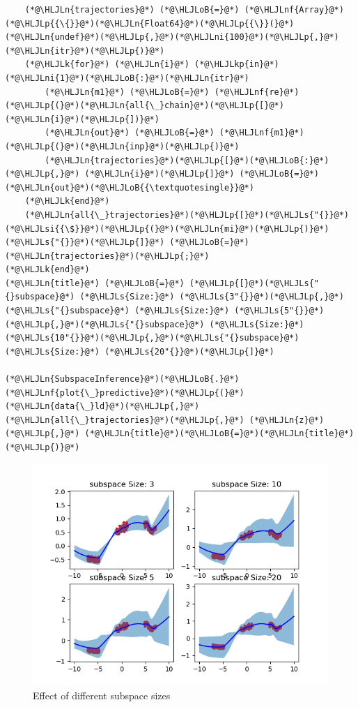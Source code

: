 \documentclass[12pt,a4paper]{article}
\newcommand{\HLJLk}[1]{\textcolor[RGB]{148,91,176}{\textbf{#1}}}
\newcommand{\HLJLkp}[1]{\textcolor[RGB]{148,91,176}{\textbf{#1}}}
\newcommand{\HLJLn}[1]{#1}
\newcommand{\HLJLnf}[1]{\textcolor[RGB]{66,102,213}{#1}}
\newcommand{\HLJLs}[1]{\textcolor[RGB]{201,61,57}{#1}}
\newcommand{\HLJLsi}[1]{#1}
\newcommand{\HLJLni}[1]{\textcolor[RGB]{59,151,46}{#1}}
\newcommand{\HLJLoB}[1]{\textcolor[RGB]{102,102,102}{\textbf{#1}}}
\newcommand{\HLJLp}[1]{#1}
\begin{document}
\begin{lstlisting}
    (*@\HLJLn{trajectories}@*) (*@\HLJLoB{=}@*) (*@\HLJLnf{Array}@*)(*@\HLJLp{{\{}}@*)(*@\HLJLn{Float64}@*)(*@\HLJLp{{\}}(}@*)(*@\HLJLn{undef}@*)(*@\HLJLp{,}@*)(*@\HLJLni{100}@*)(*@\HLJLp{,}@*)(*@\HLJLn{itr}@*)(*@\HLJLp{)}@*)
    (*@\HLJLk{for}@*) (*@\HLJLn{i}@*) (*@\HLJLkp{in}@*) (*@\HLJLni{1}@*)(*@\HLJLoB{:}@*)(*@\HLJLn{itr}@*)
        (*@\HLJLn{m1}@*) (*@\HLJLoB{=}@*) (*@\HLJLnf{re}@*)(*@\HLJLp{(}@*)(*@\HLJLn{all{\_}chain}@*)(*@\HLJLp{[}@*)(*@\HLJLn{i}@*)(*@\HLJLp{])}@*)
        (*@\HLJLn{out}@*) (*@\HLJLoB{=}@*) (*@\HLJLnf{m1}@*)(*@\HLJLp{(}@*)(*@\HLJLn{inp}@*)(*@\HLJLp{)}@*)
        (*@\HLJLn{trajectories}@*)(*@\HLJLp{[}@*)(*@\HLJLoB{:}@*)(*@\HLJLp{,}@*) (*@\HLJLn{i}@*)(*@\HLJLp{]}@*) (*@\HLJLoB{=}@*) (*@\HLJLn{out}@*)(*@\HLJLoB{{\textquotesingle}}@*)
    (*@\HLJLk{end}@*)
    (*@\HLJLn{all{\_}trajectories}@*)(*@\HLJLp{[}@*)(*@\HLJLs{"{}}@*)(*@\HLJLsi{{\$}}@*)(*@\HLJLp{(}@*)(*@\HLJLn{mi}@*)(*@\HLJLp{)}@*)(*@\HLJLs{"{}}@*)(*@\HLJLp{]}@*) (*@\HLJLoB{=}@*) (*@\HLJLn{trajectories}@*)(*@\HLJLp{;}@*)
(*@\HLJLk{end}@*)
(*@\HLJLn{title}@*) (*@\HLJLoB{=}@*) (*@\HLJLp{[}@*)(*@\HLJLs{"{}subspace}@*) (*@\HLJLs{Size:}@*) (*@\HLJLs{3"{}}@*)(*@\HLJLp{,}@*)(*@\HLJLs{"{}subspace}@*) (*@\HLJLs{Size:}@*) (*@\HLJLs{5"{}}@*)(*@\HLJLp{,}@*)(*@\HLJLs{"{}subspace}@*) (*@\HLJLs{Size:}@*) (*@\HLJLs{10"{}}@*)(*@\HLJLp{,}@*)(*@\HLJLs{"{}subspace}@*) (*@\HLJLs{Size:}@*) (*@\HLJLs{20"{}}@*)(*@\HLJLp{]}@*)

(*@\HLJLn{SubspaceInference}@*)(*@\HLJLoB{.}@*)(*@\HLJLnf{plot{\_}predictive}@*)(*@\HLJLp{(}@*)(*@\HLJLn{data{\_}ld}@*)(*@\HLJLp{,}@*) (*@\HLJLn{all{\_}trajectories}@*)(*@\HLJLp{,}@*) (*@\HLJLn{z}@*)(*@\HLJLp{,}@*) (*@\HLJLn{title}@*)(*@\HLJLoB{=}@*)(*@\HLJLn{title}@*)(*@\HLJLp{)}@*)
\end{lstlisting}

\begin{figure}
\centering
\includegraphics{img/com_diff_sub.png}
\caption{Effect of different subspace sizes}
\end{figure}
\end{document}
